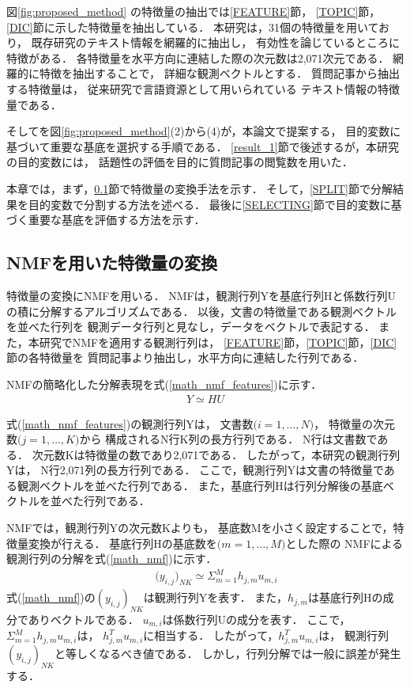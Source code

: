 \documentclass[12pt,a4paper,twocolumn,twoside]{jsik}
\begin{document}
図\ref{fig:proposed_method}
の特徴量の抽出では\ref{FEATURE}節，
\ref{TOPIC}節，\ref{DIC}節に示した特徴量を抽出している．
%
本研究は，31個の特徴量を用いており，
既存研究のテキスト情報を網羅的に抽出し，
有効性を論じているところに特徴がある．
各特徴量を水平方向に連結した際の次元数は2,071次元である．
%
網羅的に特徴を抽出することで，
詳細な観測ベクトルとする．
%
質問記事から抽出する特徴量は，
従来研究で言語資源として用いられている
テキスト情報の特徴量である．

そしてを図\ref{fig:proposed_method}(2)から(4)が，本論文で提案する，
目的変数に基づいて重要な基底を選択する手順である．
%
\ref{result_1}節で後述するが，本研究の目的変数には，
話題性の評価を目的に質問記事の閲覧数を用いた．

本章では，まず，\ref{CONVERSION}節で特徴量の変換手法を示す．
そして，\ref{SPLIT}節で分解結果を目的変数で分割する方法を述べる．
最後に\ref{SELECTING}節で目的変数に基づく重要な基底を評価する方法を示す．

\subsection{NMFを用いた特徴量の変換}\label{CONVERSION}
特徴量の変換にNMFを用いる．
NMFは，観測行列Yを基底行列Hと係数行列Uの積に分解するアルゴリズムである．
%
以後，文書の特徴量である観測ベクトルを並べた行列を
観測データ行列と見なし，データをベクトルで表記する．
%
また，本研究でNMFを適用する観測行列は，
\ref{FEATURE}節，\ref{TOPIC}節，\ref{DIC}節の各特徴量を
質問記事より抽出し，水平方向に連結した行列である．

NMFの簡略化した分解表現を式(\ref{math_nmf_features})に示す．
%
\begin{eqnarray}
\label{math_nmf_features}
\qquad Y\simeq HU \qquad
\end{eqnarray}

式(\ref{math_nmf_features})の観測行列Yは，
文書数$\big(i = 1, \ldots ,N \big)$，
特徴量の次元数$\big(j = 1, \ldots ,K \big)$から
構成されるN行K列の長方行列である．
N行は文書数である．
次元数Kは特徴量の数であり2,071である．
%
したがって，本研究の観測行列Yは，
N行2,071列の長方行列である．
%
ここで，観測行列Yは文書の特徴量である観測ベクトルを並べた行列である．
また，基底行列Hは行列分解後の基底ベクトルを並べた行列である．

NMFでは，観測行列Yの次元数Kよりも，
基底数Mを小さく設定することで，特徴量変換が行える．
%
基底行列Hの基底数を$\big(m = 1, \ldots ,M \big)$とした際の
NMFによる観測行列の分解を式(\ref{math_nmf})に示す．
%
\begin{eqnarray}
\label{math_nmf}
\qquad \big( y_{i,j} \big)_{NK} \simeq  \Sigma_{m=1}^M h_{j,m}u_{m,i}
\end{eqnarray}
%
式(\ref{math_nmf})の$(y_{i,j})_{NK}$は観測行列Yを表す．
また，$h_{j,m}$は基底行列Hの成分でありベクトルである．
$u_{m,i}$は係数行列Uの成分を表す．
%
ここで，$\Sigma_{m=1}^M h_{j,m}u_{m,i}$は，
$h_{j,m}^{T}$$u_{m,i}$に相当する．
したがって，$h_{j,m}^{T}$$u_{m,i}$は，
観測行列$(y_{i,j})_{NK}$と等しくなるべき値である．
しかし，行列分解では一般に誤差が発生する．
\end{document}
